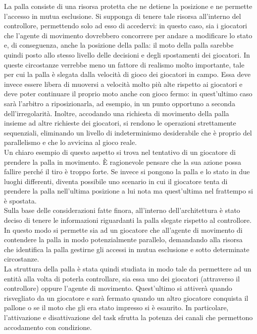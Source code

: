 La palla consiste di una risorsa protetta che ne detiene la posizione e ne permette l'accesso in mutua esclusione. Si supponga di tenere tale risorsa all'interno del controllore, permettendo solo ad esso di accedervi: in questo caso, sia i giocatori che l'agente di movimento dovrebbero concorrere per andare a modificare lo stato e, di conseguenza, anche la posizione della palla: il moto della palla sarebbe quindi posto allo stesso livello delle decisioni e degli spostamenti dei giocatori. In queste circostanze verrebbe meno un fattore di realismo molto importante, tale per cui la palla è slegata dalla velocità di gioco dei giocatori in campo. Essa deve invece essere libera di muoversi a velocità molto più alte rispetto ai giocatori e deve poter continuare il proprio moto anche con gioco fermo: in quest'ultimo caso sarà l'arbitro a riposizionarla, ad esempio, in un punto opportuno a seconda dell'irregolarità. Inoltre, accodando una richiesta di movimento della palla insieme ad altre richieste dei giocatori, si rendono le operazioni strettamente sequenziali, eliminando un livello di indeterminismo desiderabile che è proprio del parallelismo e che lo avvicina al gioco reale.\\

Un chiaro esempio di questo aspetto si trova nel tentativo di un giocatore di prendere la palla in movimento. È ragionevole pensare che la sua azione possa fallire perché il tiro è troppo forte. Se invece si pongono la palla e lo stato in due luoghi differenti, diventa possibile uno scenario in cui il giocatore tenta di prendere la palla nell'ultima posizione a lui nota ma quest'ultima nel frattempo si è spostata.\\

Sulla base delle considerazioni fatte finora, all'interno dell'architettura è stato deciso di tenere le informazioni riguardanti la palla slegate rispetto al controllore. In questo modo si permette sia ad un giocatore che all'agente di movimento di contendere la palla in modo potenzialmente parallelo, demandando alla risorsa che identifica la palla gestirne gli accessi in mutua esclusione e sotto determinate circostanze.\\

La struttura della palla è stata quindi studiata in modo tale da permettere ad un entità alla volta di poterla controllare, sia essa uno dei giocatori (attraverso il controllore) oppure l'agente di movimento. Quest'ultimo si attiverà quando risvegliato da un giocatore e sarà fermato quando un altro giocatore conquista il pallone o se il moto che gli era stato impresso si è esaurito. In particolare, l'attivazione e disattivazione del task sfrutta la potenza dei canali che permettono accodamento con condizione.

